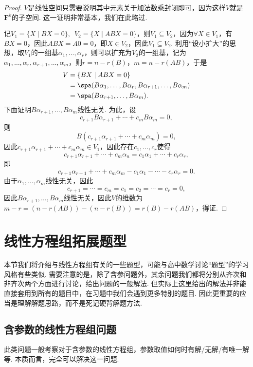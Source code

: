 \begin{proof}
    $V$是线性空间只需要说明其中元素关于加法数乘封闭即可，因为这样$V$就是$\mathbf{F}^k$的子空间. 这一证明非常基本，我们在此略过.

    记$V_1=\{X\mid BX=0\},\enspace V_2=\{X\mid ABX=0\}$，则$V_1\subseteq V_2$，因为$\forall X\in V_1$，有$BX=0$，因此$ABX=A0=0$，即$X\in V_2$，因此$V_1\subseteq V_2$. 利用``设小扩大''的思想，取$V_1$的一组基$\alpha_1,\ldots,\alpha_r$，则可以扩充为$V_2$的一组基，记为$\alpha_1,\ldots,\alpha_r,\alpha_{r+1},\ldots,\alpha_m$，则$r=n-r(B)$，$m=n-r(AB)$，于是
    \begin{align*}
        V & =\{BX\mid ABX=0\}                                                \\
          & =\spa(B\alpha_1,\ldots,B\alpha_r,B\alpha_{r+1},\ldots,B\alpha_m) \\
          & =\spa(B\alpha_{r+1},\ldots,B\alpha_m).
    \end{align*}
    下面证明$B\alpha_{r+1},\ldots,B\alpha_m$线性无关. 为此，设
    \[c_{r+1}B\alpha_{r+1}+\cdots+c_mB\alpha_m=0,\]
    则
    \[B(c_{r+1}\alpha_{r+1}+\cdots+c_m\alpha_m)=0,\]
    因此$c_{r+1}\alpha_{r+1}+\cdots+c_m\alpha_m\in V_1$，因此存在$c_1,\ldots,c_r$使得
    \[c_{r+1}\alpha_{r+1}+\cdots+c_m\alpha_n=c_1\alpha_1+\cdots+c_r\alpha_r,\]
    即
    \[c_{r+1}\alpha_{r+1}+\cdots+c_m\alpha_m-c_1\alpha_1-\cdots-c_r\alpha_r=0.\]
    由于$\alpha_1,\ldots,\alpha_m$线性无关，因此
    \[c_{r+1}=\cdots=c_m=c_1=c_2=\cdots=c_r=0,\]
    因此$B\alpha_{r+1},\ldots,B\alpha_m$线性无关，因此$V$的维数为$m-r=(n-r(AB))-(n-r(B))=r(B)-r(AB)$，得证.
\end{proof}

\section{线性方程组拓展题型}

本节我们将介绍与线性方程组有关的一些题型，可能与高中数学讨论``题型''的学习风格有些类似. 需要注意的是，除了含参问题外，其余问题我们都将分别从齐次和非齐次两个方面进行讨论，给出问题的一般解法. 但实际上这里给出的解法并非能直接套用到所有的题目中，在习题中我们会遇到更多特别的题目. 因此更重要的应当是理解解题思路，而不是死记硬背解题方法.

\subsection{含参数的线性方程组问题}

此类问题一般考察对于含参数的线性方程组，参数取值如何时有解/无解/有唯一解等. 本质而言，完全可以解决这一问题.

